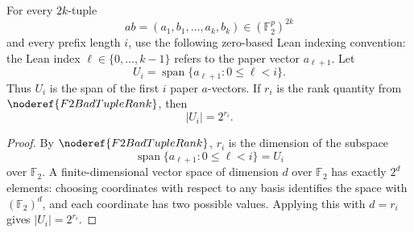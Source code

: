 \begin{helper}
For every \(2k\)-tuple
\[
  ab=(a_1,b_1,\ldots,a_k,b_k)\in(\mathbb F_2^p)^{2k}
\]
and every prefix length \(i\), use the following zero-based Lean indexing
convention: the Lean index \(\ell\in\{0,\ldots,k-1\}\) refers to the paper
vector \(a_{\ell+1}\). Let
\[
  U_i=\operatorname{span}\{a_{\ell+1}: 0\le \ell<i\}.
\]
Thus \(U_i\) is the span of the first \(i\) paper \(a\)-vectors. If \(r_i\) is
the rank quantity from \(\noderef{F2BadTupleRank}\), then
\[
  |U_i|=2^{r_i}.
\]
\end{helper}
\begin{proof}
By \(\noderef{F2BadTupleRank}\), \(r_i\) is the dimension of the subspace
\[
  \operatorname{span}\{a_{\ell+1}:0\le \ell<i\}=U_i
\]
over \(\mathbb F_2\). A finite-dimensional vector space of dimension \(d\) over
\(\mathbb F_2\) has exactly \(2^d\) elements: choosing coordinates with respect
to any basis identifies the space with \((\mathbb F_2)^d\), and each coordinate
has two possible values. Applying this with \(d=r_i\) gives \(|U_i|=2^{r_i}\).
\end{proof}
